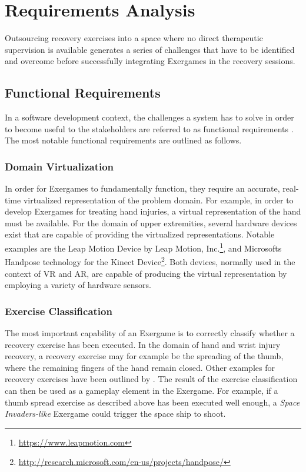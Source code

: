 \section{Requirements Analysis}
\label{sec:reqanalysis}
Outsourcing recovery exercises into a space where no direct therapeutic supervision is available generates a series of challenges that have to be identified and overcome before successfully integrating Exergames in the recovery sessions. 

\subsection{Functional Requirements}
In a software development context, the challenges a system has to solve in order to become useful to the stakeholders are referred to as functional requirements \cite{SystemRequirementsArmyFR}.  The most notable functional requirements are outlined as follows.

\subsubsection{Domain Virtualization}
In order for Exergames to fundamentally function, they require an accurate, real-time virtualized representation of the problem domain. For example, in order to develop Exergames for treating hand injuries, a virtual representation of the hand must be available. For the domain of upper extremities, several hardware devices exist that are capable of providing the virtualized representations. Notable examples are the Leap Motion Device by Leap Motion, Inc.\footnote{\url{https://www.leapmotion.com}}, and Microsofts Handpose technology for the Kinect Device\footnote{\url{http://research.microsoft.com/en-us/projects/handpose/}}. Both devices, normally used in the context of \gls{VR} and \gls{AR}, are capable of producing the virtual representation by employing a variety of hardware sensors.

\subsubsection{Exercise Classification}
\label{sec:exercise-classification}
The most important capability of an Exergame is to correctly classify whether a recovery exercise has been executed. In the domain of hand and wrist injury recovery, a recovery exercise may for example be the spreading of the thumb, where the remaining fingers of the hand remain closed. Other examples for recovery exercises have been outlined by \cite{StudiArbeitVolzBaumotte}. The result of the exercise classification can then be used as a gameplay element in the Exergame. For example, if a thumb spread exercise as described above has been executed well enough, a \emph{Space Invaders-like} Exergame could trigger the space ship to shoot.

